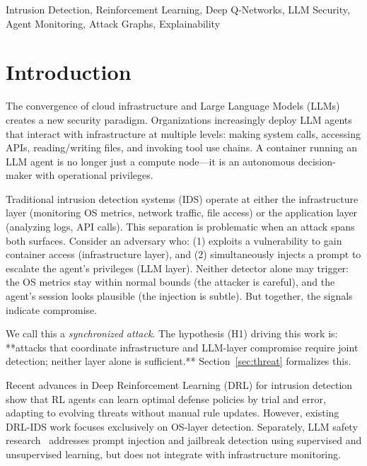 \documentclass[conference]{IEEEtran}
\begin{document}
\begin{IEEEkeywords}
Intrusion Detection, Reinforcement Learning, Deep Q-Networks, LLM Security, Agent Monitoring, Attack Graphs, Explainability
\end{IEEEkeywords}

\section{Introduction}

The convergence of cloud infrastructure and Large Language Models (LLMs) creates a new security paradigm. Organizations increasingly deploy LLM agents that interact with infrastructure at multiple levels: making system calls, accessing APIs, reading/writing files, and invoking tool use chains. A container running an LLM agent is no longer just a compute node—it is an autonomous decision-maker with operational privileges.

Traditional intrusion detection systems (IDS) operate at either the infrastructure layer (monitoring OS metrics, network traffic, file access) or the application layer (analyzing logs, API calls). This separation is problematic when an attack spans both surfaces. Consider an adversary who: (1) exploits a vulnerability to gain container access (infrastructure layer), and (2) simultaneously injects a prompt to escalate the agent's privileges (LLM layer). Neither detector alone may trigger: the OS metrics stay within normal bounds (the attacker is careful), and the agent's session looks plausible (the injection is subtle). But together, the signals indicate compromise.

We call this a \emph{synchronized attack}. The hypothesis (H1) driving this work is: **attacks that coordinate infrastructure and LLM-layer compromise require joint detection; neither layer alone is sufficient.** Section~\ref{sec:threat} formalizes this.

Recent advances in Deep Reinforcement Learning (DRL) for intrusion detection~\cite{anwar2023survey,jamshidi2024application} show that RL agents can learn optimal defense policies by trial and error, adapting to evolving threats without manual rule updates. However, existing DRL-IDS work focuses exclusively on OS-layer detection. Separately, LLM safety research~\cite{hossain2025deep,ferozuddin2025ai} addresses prompt injection and jailbreak detection using supervised and unsupervised learning, but does not integrate with infrastructure monitoring.
\end{document}
